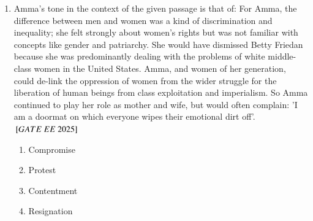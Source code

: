 \documentclass[journal,12pt,onecolumn]{IEEEtran}
\theoremstyle{remark}
\begin{document}
\begin{enumerate}
 \item Amma's tone in the context of the given passage is that of: \newline
  For Amma, the difference between men and women was a kind of discrimination and inequality; she felt strongly about women's rights but was not familiar with concepts like gender and patriarchy. She would have dismissed Betty Friedan because she was predominantly dealing with the problems of white middle-class women in the United States. Amma, and women of her generation, could de-link the oppression of women from the wider struggle for the liberation of human beings from class exploitation and imperialism. So Amma continued to play her role as mother and wife, but would often complain: 'I am a doormat on which everyone wipes their emotional dirt off'.
${}\left[GATE\ EE\ 2025\right]$\\ 
    \begin{enumerate}[label=(\Alph*)]
\item Compromise\\     
  \item Protest\\  
  \item Contentment\\  
  \item Resignation\\  
    \end{enumerate}


\end{enumerate}
\end{document}

